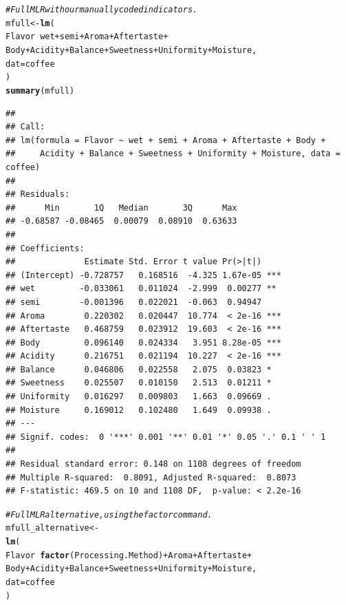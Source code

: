 \documentclass[oneside]{book}\usepackage[]{graphicx}\usepackage[dvipsnames,table,xcdraw]{xcolor}
\makeatletter
\newcommand{\hlcom}[1]{\textcolor[rgb]{0.678,0.584,0.686}{\textit{#1}}}%
\newcommand{\hlopt}[1]{\textcolor[rgb]{0,0,0}{#1}}%
\newcommand{\hlstd}[1]{\textcolor[rgb]{0.345,0.345,0.345}{#1}}%
\newcommand{\hlkwb}[1]{\textcolor[rgb]{0.69,0.353,0.396}{#1}}%
\newcommand{\hlkwc}[1]{\textcolor[rgb]{0.333,0.667,0.333}{#1}}%
\newcommand{\hlkwd}[1]{\textcolor[rgb]{0.737,0.353,0.396}{\textbf{#1}}}%
\newenvironment{kframe}{%
 \def\at@end@of@kframe{}%
 \ifinner\ifhmode%
  \def\at@end@of@kframe{\end{minipage}}%
  \begin{minipage}{\columnwidth}%
 \fi\fi%
 \def\FrameCommand##1{\hskip\@totalleftmargin \hskip-\fboxsep
 \colorbox{shadecolor}{##1}\hskip-\fboxsep
     \hskip-\linewidth \hskip-\@totalleftmargin \hskip\columnwidth}%
 \MakeFramed {\advance\hsize-\width
   \@totalleftmargin\z@ \linewidth\hsize
   \@setminipage}}%
 {\par\unskip\endMakeFramed%
 \at@end@of@kframe}
\newenvironment{knitrout}{}{} %
\makeatother
\begin{document}
\begin{knitrout}
\color{fgcolor}\begin{kframe}
\begin{alltt}
\hlcom{# Full MLR with our manually coded indicators.}
\hlstd{mfull} \hlkwb{<-} \hlkwd{lm}\hlstd{(}
\hlstd{Flavor} \hlopt{~} \hlstd{wet} \hlopt{+} \hlstd{semi} \hlopt{+} \hlstd{Aroma} \hlopt{+} \hlstd{Aftertaste} \hlopt{+}
\hlstd{Body} \hlopt{+} \hlstd{Acidity} \hlopt{+} \hlstd{Balance} \hlopt{+} \hlstd{Sweetness} \hlopt{+} \hlstd{Uniformity} \hlopt{+} \hlstd{Moisture,}
\hlkwc{dat} \hlstd{= coffee}
\hlstd{)}
\hlkwd{summary}\hlstd{(mfull)}
\end{alltt}
\begin{verbatim}
## 
## Call:
## lm(formula = Flavor ~ wet + semi + Aroma + Aftertaste + Body + 
##     Acidity + Balance + Sweetness + Uniformity + Moisture, data = coffee)
## 
## Residuals:
##      Min       1Q   Median       3Q      Max 
## -0.68587 -0.08465  0.00079  0.08910  0.63633 
## 
## Coefficients:
##              Estimate Std. Error t value Pr(>|t|)    
## (Intercept) -0.728757   0.168516  -4.325 1.67e-05 ***
## wet         -0.033061   0.011024  -2.999  0.00277 ** 
## semi        -0.001396   0.022021  -0.063  0.94947    
## Aroma        0.220302   0.020447  10.774  < 2e-16 ***
## Aftertaste   0.468759   0.023912  19.603  < 2e-16 ***
## Body         0.096140   0.024334   3.951 8.28e-05 ***
## Acidity      0.216751   0.021194  10.227  < 2e-16 ***
## Balance      0.046806   0.022558   2.075  0.03823 *  
## Sweetness    0.025507   0.010150   2.513  0.01211 *  
## Uniformity   0.016297   0.009803   1.663  0.09669 .  
## Moisture     0.169012   0.102480   1.649  0.09938 .  
## ---
## Signif. codes:  0 '***' 0.001 '**' 0.01 '*' 0.05 '.' 0.1 ' ' 1
## 
## Residual standard error: 0.148 on 1108 degrees of freedom
## Multiple R-squared:  0.8091,	Adjusted R-squared:  0.8073 
## F-statistic: 469.5 on 10 and 1108 DF,  p-value: < 2.2e-16
\end{verbatim}
\begin{alltt}
\hlcom{# Full MLR alternative, using the factor command.}
\hlstd{mfull_alternative} \hlkwb{<-}
\hlkwd{lm}\hlstd{(}
\hlstd{Flavor} \hlopt{~} \hlkwd{factor}\hlstd{(Processing.Method)} \hlopt{+} \hlstd{Aroma} \hlopt{+} \hlstd{Aftertaste} \hlopt{+}
\hlstd{Body} \hlopt{+} \hlstd{Acidity} \hlopt{+} \hlstd{Balance} \hlopt{+} \hlstd{Sweetness} \hlopt{+} \hlstd{Uniformity} \hlopt{+} \hlstd{Moisture,}
\hlkwc{dat} \hlstd{= coffee}
\hlstd{)}
\end{alltt}
\end{kframe}
\end{knitrout}
\end{document}
